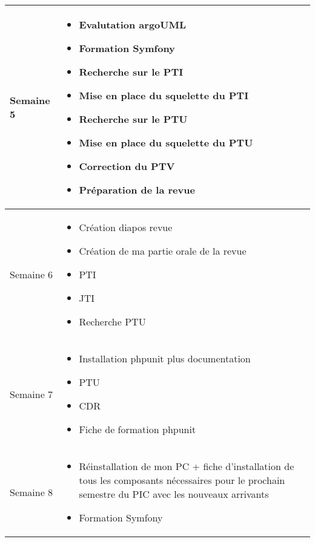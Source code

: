 \documentclass [a4paper] {article}
\begin{document}
\section*{\Michel}

\begin{tabularx}{16.8cm}{|>{\columncolor{gray!40}}l|X|}
	\hline
	Semaine 5 & \begin{itemize}
					\item Evalutation argoUML
					\item Formation Symfony
					\item Recherche sur le PTI 
					\item Mise en place du squelette du PTI
					\item Recherche sur le PTU
					\item Mise en place du squelette du PTU
					\item Correction du PTV
					\item Préparation de la revue
				\end{itemize} \\
	\hline
	
	Semaine 6 & \begin{itemize}
					\item Création diapos revue
					\item Création de ma partie orale de la revue
					\item PTI
					\item JTI
					\item Recherche PTU
				\end{itemize} \\
				
	\hline
	
	Semaine 7 & \begin{itemize}
					\item Installation phpunit plus documentation
					\item PTU
					\item CDR
					\item Fiche de formation phpunit
				\end{itemize}\\
	\hline

	Semaine 8 & \begin{itemize}
					\item Réinstallation de mon PC + fiche d'installation de tous les composants nécessaires pour le prochain semestre du PIC avec les nouveaux arrivants
					\item Formation Symfony
				\end{itemize}\\
	\hline
	

\end{tabularx}
\end{document}
